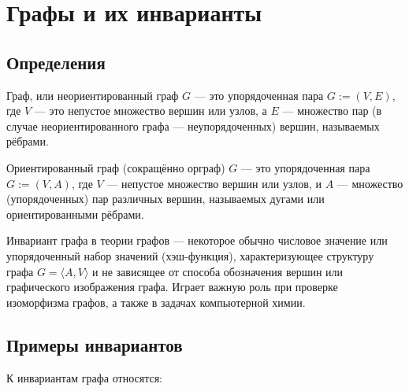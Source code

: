 \chapter{Графы и их инварианты}

\section{Определения}

\begin{my_def}
Граф, или неориентированный граф $G$ — это упорядоченная пара $G:=(V,E)$, где $V$ — это непустое множество вершин или узлов, а $E$ — множество пар (в случае неориентированного графа — неупорядоченных) вершин, называемых рёбрами.
\end{my_def}

\begin{my_def}
Ориентированный граф (сокращённо орграф)  $G$ — это упорядоченная пара  $G:=(V,A)$, где  $V$ — непустое множество вершин или узлов, и  $A$ — множество (упорядоченных) пар различных вершин, называемых дугами или ориентированными рёбрами.
\end{my_def}

\begin{my_def}
Инвариант графа в теории графов — некоторое обычно числовое значение или упорядоченный набор значений (хэш-функция), характеризующее структуру графа  $G=\langle A,V\rangle$  и не зависящее от способа обозначения вершин или графического изображения графа. Играет важную роль при проверке изоморфизма графов, а также в задачах компьютерной химии.
\end{my_def}

\section{Примеры инвариантов}

К инвариантам графа относятся:

